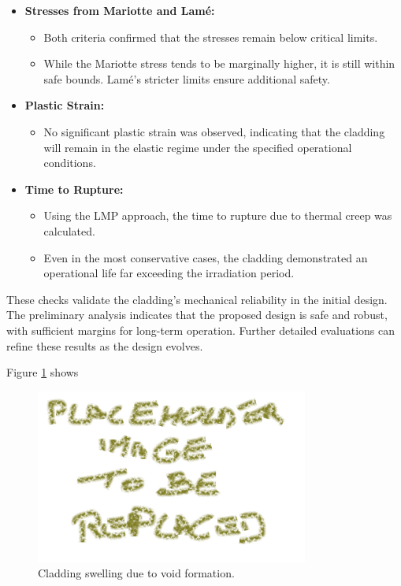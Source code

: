 \begin{itemize}
    \item \textbf{Stresses from Mariotte and Lamé:}
    \begin{itemize}
        \item Both criteria confirmed that the stresses remain below critical limits.
        \item While the Mariotte stress tends to be marginally higher, it is still within safe bounds. Lamé's stricter limits ensure additional safety.
    \end{itemize}

    \item \textbf{Plastic Strain:}
    \begin{itemize}
        \item No significant plastic strain was observed, indicating that the cladding will remain in the elastic regime under the specified operational conditions.
    \end{itemize}

    \item \textbf{Time to Rupture:}
    \begin{itemize}
        \item Using the LMP approach, the time to rupture due to thermal creep was calculated.
        \item Even in the most conservative cases, the cladding demonstrated an operational life far exceeding the irradiation period.
    \end{itemize}
\end{itemize}

These checks validate the cladding's mechanical reliability in the initial design. The preliminary analysis indicates that the proposed design is safe and robust, with sufficient margins for long-term operation. Further detailed evaluations can refine these results as the design evolves.

Figure \ref{fig:stress_analysis} shows 

\begin{figure}[H]
\centering
\includegraphics[width=0.8\textwidth]{placeholder.png}
\caption{Cladding swelling due to void formation.}
\label{fig:stress_analysis}
\end{figure}
